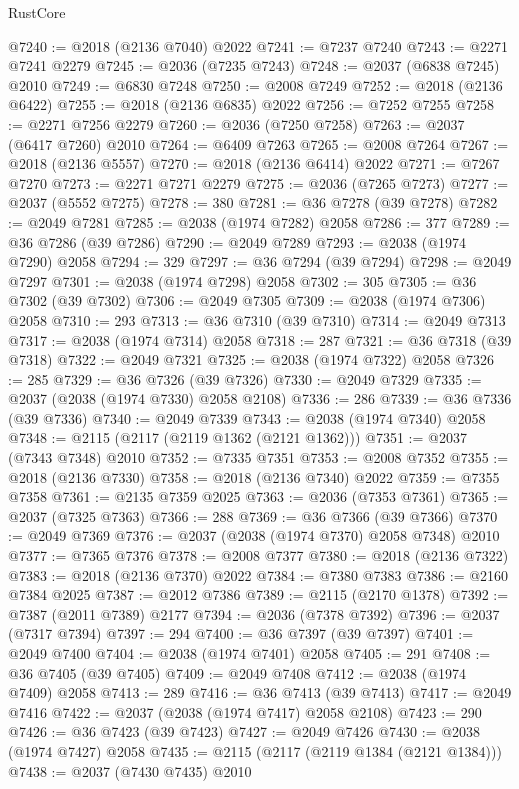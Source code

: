 \begin{lexlean}{RustCore}
\begin{coremodule}
@7240 := @2018 (@2136 @7040) @2022
@7241 := @7237 @7240
@7243 := @2271 @7241 @2279
@7245 := @2036 (@7235 @7243)
@7248 := @2037 (@6838 @7245) @2010
@7249 := @6830 @7248
@7250 := @2008 @7249
@7252 := @2018 (@2136 @6422)
@7255 := @2018 (@2136 @6835) @2022
@7256 := @7252 @7255
@7258 := @2271 @7256 @2279
@7260 := @2036 (@7250 @7258)
@7263 := @2037 (@6417 @7260) @2010
@7264 := @6409 @7263
@7265 := @2008 @7264
@7267 := @2018 (@2136 @5557)
@7270 := @2018 (@2136 @6414) @2022
@7271 := @7267 @7270
@7273 := @2271 @7271 @2279
@7275 := @2036 (@7265 @7273)
@7277 := @2037 (@5552 @7275)
@7278 := 380
@7281 := @36 @7278 (@39 @7278)
@7282 := @2049 @7281
@7285 := @2038 (@1974 @7282) @2058
@7286 := 377
@7289 := @36 @7286 (@39 @7286)
@7290 := @2049 @7289
@7293 := @2038 (@1974 @7290) @2058
@7294 := 329
@7297 := @36 @7294 (@39 @7294)
@7298 := @2049 @7297
@7301 := @2038 (@1974 @7298) @2058
@7302 := 305
@7305 := @36 @7302 (@39 @7302)
@7306 := @2049 @7305
@7309 := @2038 (@1974 @7306) @2058
@7310 := 293
@7313 := @36 @7310 (@39 @7310)
@7314 := @2049 @7313
@7317 := @2038 (@1974 @7314) @2058
@7318 := 287
@7321 := @36 @7318 (@39 @7318)
@7322 := @2049 @7321
@7325 := @2038 (@1974 @7322) @2058
@7326 := 285
@7329 := @36 @7326 (@39 @7326)
@7330 := @2049 @7329
@7335 := @2037 (@2038 (@1974 @7330) @2058 @2108)
@7336 := 286
@7339 := @36 @7336 (@39 @7336)
@7340 := @2049 @7339
@7343 := @2038 (@1974 @7340) @2058
@7348 := @2115 (@2117 (@2119 @1362 (@2121 @1362)))
@7351 := @2037 (@7343 @7348) @2010
@7352 := @7335 @7351
@7353 := @2008 @7352
@7355 := @2018 (@2136 @7330)
@7358 := @2018 (@2136 @7340) @2022
@7359 := @7355 @7358
@7361 := @2135 @7359 @2025
@7363 := @2036 (@7353 @7361)
@7365 := @2037 (@7325 @7363)
@7366 := 288
@7369 := @36 @7366 (@39 @7366)
@7370 := @2049 @7369
@7376 := @2037 (@2038 (@1974 @7370) @2058 @7348) @2010
@7377 := @7365 @7376
@7378 := @2008 @7377
@7380 := @2018 (@2136 @7322)
@7383 := @2018 (@2136 @7370) @2022
@7384 := @7380 @7383
@7386 := @2160 @7384 @2025
@7387 := @2012 @7386
@7389 := @2115 (@2170 @1378)
@7392 := @7387 (@2011 @7389) @2177
@7394 := @2036 (@7378 @7392)
@7396 := @2037 (@7317 @7394)
@7397 := 294
@7400 := @36 @7397 (@39 @7397)
@7401 := @2049 @7400
@7404 := @2038 (@1974 @7401) @2058
@7405 := 291
@7408 := @36 @7405 (@39 @7405)
@7409 := @2049 @7408
@7412 := @2038 (@1974 @7409) @2058
@7413 := 289
@7416 := @36 @7413 (@39 @7413)
@7417 := @2049 @7416
@7422 := @2037 (@2038 (@1974 @7417) @2058 @2108)
@7423 := 290
@7426 := @36 @7423 (@39 @7423)
@7427 := @2049 @7426
@7430 := @2038 (@1974 @7427) @2058
@7435 := @2115 (@2117 (@2119 @1384 (@2121 @1384)))
@7438 := @2037 (@7430 @7435) @2010

\end{coremodule}
\end{lexlean}
